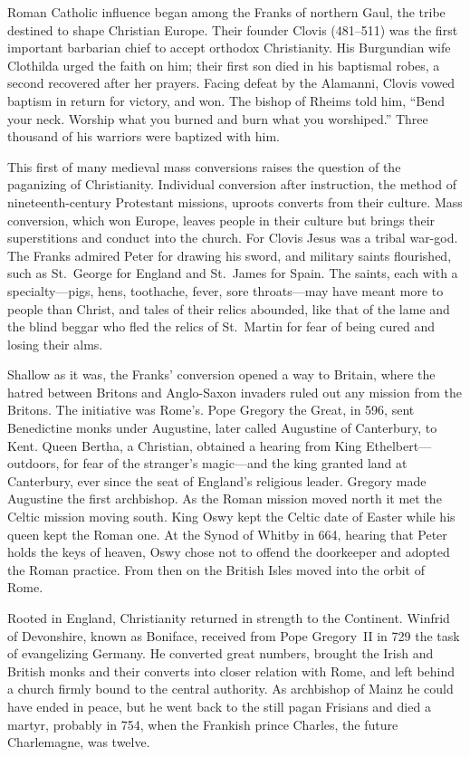 Roman Catholic influence began among the Franks of northern Gaul, the tribe destined to shape
Christian Europe. Their founder Clovis (481--511) was the first important barbarian chief to accept
orthodox Christianity. His Burgundian wife Clothilda urged the faith on him; their first son died in
his baptismal robes, a second recovered after her prayers. Facing defeat by the Alamanni, Clovis
vowed baptism in return for victory, and won. The bishop of Rheims told him, ``Bend your neck. Worship
what you burned and burn what you worshiped.'' Three thousand of his warriors were baptized with him.

This first of many medieval mass conversions raises the question of the paganizing of Christianity.
Individual conversion after instruction, the method of nineteenth-century Protestant missions,
uproots converts from their culture. Mass conversion, which won Europe, leaves people in their
culture but brings their superstitions and conduct into the church. For Clovis Jesus was a tribal
war-god. The Franks admired Peter for drawing his sword, and military saints flourished, such as
St.~George for England and St.~James for Spain. The saints, each with a specialty---pigs, hens,
toothache, fever, sore throats---may have meant more to people than Christ, and tales of their
relics abounded, like that of the lame and the blind beggar who fled the relics of St.~Martin for
fear of being cured and losing their alms.

Shallow as it was, the Franks' conversion opened a way to Britain, where the hatred between Britons
and Anglo-Saxon invaders ruled out any mission from the Britons. The initiative was Rome's. Pope Gregory the Great, in 596, sent Benedictine monks under Augustine, later called Augustine of
Canterbury, to Kent. Queen Bertha, a Christian, obtained a hearing from King Ethelbert---outdoors,
for fear of the stranger's magic---and the king granted land at Canterbury, ever since the seat of
England's religious leader. Gregory made Augustine the first archbishop. As the Roman mission moved
north it met the Celtic mission moving south. King Oswy kept the Celtic date of Easter while his
queen kept the Roman one. At the Synod of Whitby in 664, hearing that Peter holds the keys of heaven,
Oswy chose not to offend the doorkeeper and adopted the Roman practice. From then on the British Isles
moved into the orbit of Rome.

Rooted in England, Christianity returned in strength to the Continent. Winfrid of Devonshire, known
as Boniface, received from Pope Gregory~II in 729 the task of evangelizing Germany. He converted great
numbers, brought the Irish and British monks and their converts into closer relation with Rome, and
left behind a church firmly bound to the central authority. As archbishop of Mainz he could have ended
in peace, but he went back to the still pagan Frisians and died a martyr, probably in 754, when the
Frankish prince Charles, the future Charlemagne, was twelve.

